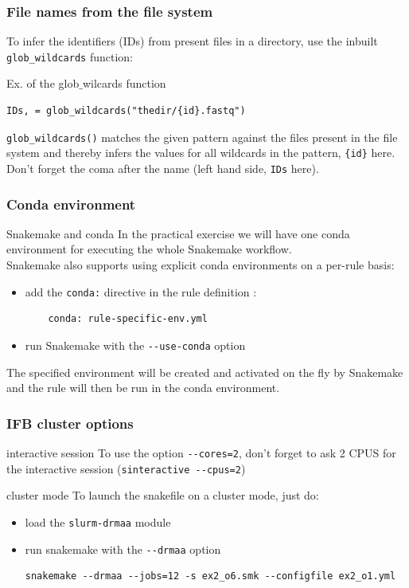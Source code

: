 \begin{frame}[containsverbatim]
\frametitle{File names from the file system}
To infer the identifiers (IDs) from present files in a directory, use the inbuilt \verb|glob_wildcards| function:
\begin{block}{Ex. of the glob$\_$wilcards function}
\begin{lstlisting}
IDs, = glob_wildcards("thedir/{id}.fastq")
\end{lstlisting}
\end{block}
\verb|glob_wildcards()| matches the given pattern against the files present in the file system and thereby infers the values for all wildcards in the pattern, \verb|{id}| here. 
\vfill
Don't forget the coma after the name (left hand side, \verb|IDs| here).
\end{frame}
\begin{frame}[containsverbatim]
\frametitle{Conda environment}
\begin{block}{Snakemake and conda}
In the practical exercise we will have one conda environment for executing the whole Snakemake workflow. \\
Snakemake also supports using explicit conda environments on a per-rule basis:
\begin{itemize}
    \item add the \verb|conda:| directive in the rule definition :
\begin{lstlisting}
    conda: rule-specific-env.yml
\end{lstlisting}
    \item run Snakemake with the \verb|--use-conda| option
\end{itemize}
The specified environment will be created and activated on the fly by Snakemake and the rule will then be run in the conda environment.
\end{block}
\end{frame}
\begin{frame}[containsverbatim]
\frametitle{IFB cluster options}
\begin{block}{interactive session}
To use the option \verb|--cores=2|, don't forget to ask 2 CPUS for the interactive session (\verb|sinteractive --cpus=2|)
\end{block}
\begin{block}{cluster mode}
To launch the snakefile on a cluster mode, just do:
\begin{itemize}
    \item load the \verb|slurm-drmaa| module
    \item run snakemake with the \verb|--drmaa| option
\begin{lstlisting}
snakemake --drmaa --jobs=12 -s ex2_o6.smk --configfile ex2_o1.yml
\end{lstlisting}
\end{itemize}
\end{block}
\end{frame}
